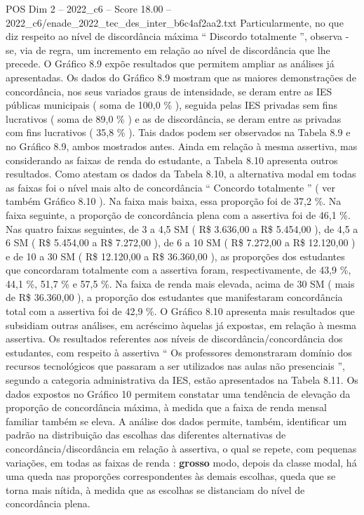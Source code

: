 \begin{textsample}{POS Dim 2 – 2022\_c6 – Score 18.00 – 2022\_c6/enade\_2022\_tec\_des\_inter\_b6c4af2aa2.txt}
Particularmente, no que diz respeito ao nível de discordância máxima “ Discordo totalmente ”, observa -se, via de regra, um incremento em relação ao nível de discordância que lhe precede.
O Gráfico 8.9 expõe resultados que permitem ampliar as análises já apresentadas.
Os dados do Gráfico 8.9 mostram que as maiores demonstrações de concordância, nos seus variados graus de intensidade, se deram entre as IES públicas municipais ( soma de 100,0 \% ), seguida pelas IES privadas sem fins lucrativos ( soma de 89,0 \% ) e as de discordância, se deram entre as privadas com fins lucrativos ( 35,8 \% ).
Tais dados podem ser observados na Tabela 8.9 e no Gráfico 8.9, ambos mostrados antes.
Ainda em relação à mesma assertiva, mas considerando as faixas de renda do estudante, a Tabela 8.10 apresenta outros resultados.
Como atestam os dados da Tabela 8.10, a alternativa modal em todas as faixas foi o nível mais alto de concordância “ Concordo totalmente ” ( ver também Gráfico 8.10 ).
Na faixa mais baixa, essa proporção foi de 37,2 \%.
Na faixa seguinte, a proporção de concordância plena com a assertiva foi de 46,1 \%.
Nas quatro faixas seguintes, de 3 a 4,5 SM ( R\$ 3.636,00 a R\$ 5.454,00 ), de 4,5 a 6 SM ( R\$ 5.454,00 a R\$ 7.272,00 ), de 6 a 10 SM ( R\$ 7.272,00 a R\$ 12.120,00 ) e de 10 a 30 SM ( R\$ 12.120,00 a R\$ 36.360,00 ), as proporções dos estudantes que concordaram totalmente com a assertiva foram, respectivamente, de 43,9 \%, 44,1 \%, 51,7 \% e 57,5 \%.
Na faixa de renda mais elevada, acima de 30 SM ( mais de R\$ 36.360,00 ), a proporção dos estudantes que manifestaram concordância total com a assertiva foi de 42,9 \%.
O Gráfico 8.10 apresenta mais resultados que subsidiam outras análises, em acréscimo àquelas já expostas, em relação à mesma assertiva.
Os resultados referentes aos níveis de discordância/concordância dos estudantes, com respeito à assertiva “ Os professores demonstraram domínio dos recursos tecnológicos que passaram a ser utilizados nas aulas não presenciais ”, segundo a categoria administrativa da IES, estão apresentados na Tabela 8.11.
Os dados expostos no Gráfico 10 permitem constatar uma tendência de elevação da proporção de concordância máxima, à medida que a faixa de renda mensal familiar também se eleva.
A análise dos dados permite, também, identificar um padrão na distribuição das escolhas das diferentes alternativas de concordância/discordância em relação à assertiva, o qual se repete, com pequenas variações, em todas as faixas de renda : \textbf{grosso} modo, depois da classe modal, há uma queda nas proporções correspondentes às demais escolhas, queda que se torna mais nítida, à medida que as escolhas se distanciam do nível de concordância plena.

\end{textsample}
